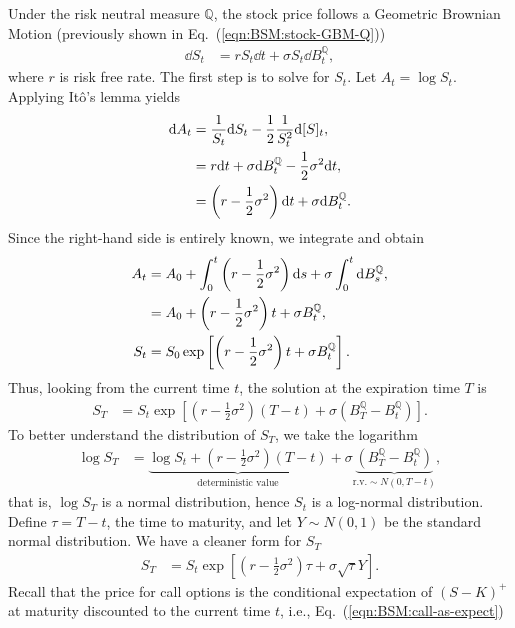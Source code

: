 \documentclass{book}
\begin{document}
Under the risk neutral measure $\mathbb{Q}$, the stock price follows a Geometric Brownian Motion (previously shown in Eq.~(\ref{eqn:BSM:stock-GBM-Q}))
\begin{align*}
    \dd S_t &= r S_t \dd t +\sigma S_t \dd B_t^\mathbb{Q},
\end{align*}
where $r$ is risk free rate. The first step is to solve for $S_t$. Let $A_t = \log S_t$. Applying Itô’s lemma yields
\begin{align}
    \dd A_t &= \frac{1}{S_t} \dd S_t - \frac{1}{2} \frac{1}{S_t^2} {\dd} {[S]_t}, \notag\\
    &= r \dd t +\sigma \dd B_t^\mathbb{Q} - \frac{1}{2} \sigma^2 \dd t, \notag\\
    &= \left(r - \frac{1}{2} \sigma^2\right) \dd t + \sigma  \dd B_t^\mathbb{Q}.
\end{align}
Since the right-hand side is entirely known, we integrate and obtain
\begin{align}
    A_t &= A_0 + \int_0^t \left(r - \frac{1}{2} \sigma^2\right) \dd s + \sigma \int_0^t \dd B_s^\mathbb{Q}, \notag\\
    &=  A_0 + \left(r - \frac{1}{2} \sigma^2\right)t+ \sigma  B_t^\mathbb{Q}, \notag\\
    S_t &= {S_0} \exp \left[ \left(r - \frac{1}{2} \sigma^2\right)t + \sigma  B_t^\mathbb{Q} \right].
\end{align}
Thus, looking from the current time $t$, the solution at the expiration time $T$ is 
\begin{align}
    S_T &= {S_t} \exp \left[ \left(r - \frac{1}{2} \sigma^2\right)(T - t) + \sigma  \left(B_T^\mathbb{Q} - B_t^\mathbb{Q}\right) \right].
\end{align}
To better understand the distribution of $S_T$, we take the logarithm
\begin{align}
    \log S_T &= \underbrace{\log {S_t} + \left(r - \frac{1}{2} \sigma^2\right)(T - t)}_{\text{deterministic value}} + \sigma \underbrace{\left(B_T^\mathbb{Q} - B_t^\mathbb{Q}\right)}_{\text{r.v.} \sim N(0,  T - t)},
\end{align}
that is, $\log S_T$ is a normal distribution, hence $S_t$ is a log-normal distribution. Define $\tau = T - t$, the time to maturity, and let $Y\sim N(0,1)$ be the standard normal distribution. We have a cleaner form for $S_T$
\begin{align}
    S_T &= {S_t} \exp \left[ \left(r - \frac{1}{2} \sigma^2\right)\tau + \sigma  \sqrt{\tau} Y \right].
\end{align}
Recall that the price for call options is the conditional expectation of $(S - K)^+$ at maturity discounted to the current time $t$, i.e., Eq.~(\ref{eqn:BSM:call-as-expect})
\end{document}
